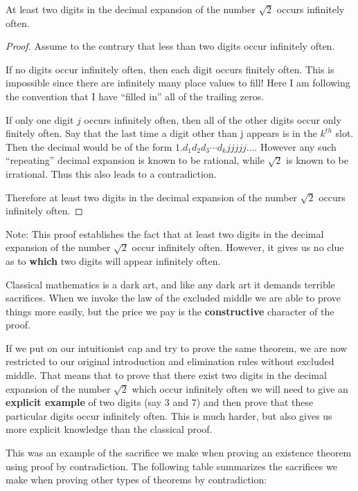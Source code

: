 \begin{example}

At least two digits in the decimal expansion of the number $\sqrt{2}$ occurs infinitely often. 

\begin{proof}
Assume to the contrary that less than two digits occur infinitely often.

If no digits occur infinitely often, then each digit occurs finitely often.  This is impossible since there are infinitely many place values to fill!  Here I am following the convention that I have ``filled in'' all of the trailing zeros.

If only one digit $j$ occurs infinitely often, then all of the other digits occur only finitely often.  Say that the last time a digit other than j appears is in the $k^{th}$ slot.  Then the decimal would be of the form $1.d_1d_2d_3\cdots d_kjjjjj...$.  However any such ``repeating'' decimal expansion is known to be rational, while $\sqrt{2}$ is known to be irrational.    Thus this also leads to a contradiction.

Therefore at least two digits in the decimal expansion of the number $\sqrt{2}$ occurs infinitely often. 
\end{proof}
	\end{example}

Note:  This proof establishes the fact that at least two digits in the decimal expansion of the number $\sqrt{2}$ occur infinitely often.  However, it gives us no clue as to \textbf{which} two digits will appear infinitely often.  

Classical mathematics is a dark art, and like any dark art it demands terrible sacrifices.  When we invoke the law of the excluded middle we are able to prove things more easily, but the price we pay is the \textbf{constructive} character of the proof.  

If we put on our intuitionist cap and try to prove the same theorem, we are now restricted to our original introduction and elimination rules without excluded middle.  That means that to prove that  there exist two digits in the decimal expansion of the number $\sqrt{2}$ which occur infinitely often we will need to give an \textbf{explicit example} of two digits (say $3$ and $7$) and then prove that these particular digits occur infinitely often.  This is much harder, but also gives us more explicit knowledge than the classical proof.

This was an example of the sacrifice we make when proving an existence theorem using proof by contradiction.  The following table summarizes the sacrifices we make when proving other types of theorems by contradiction:


